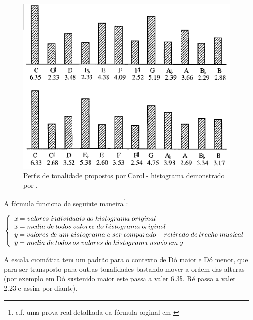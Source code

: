 \documentclass[
	12pt,				%
	openright,			%
	twoside,			%
	a4paper,			%
	english,			%
	french,				%
	spanish,			%
	brazil				%
	]{abntex2}
\begin{document}
\begin{figure}[!h]
	\caption{\label{fig_grafico}Perfis de tonalidade propostos por Carol  - histograma demonstrado por . }
	\begin{center}
	    \includegraphics[scale=0.6]{CBMS/krumhansl_temperley_p174.png}
	\end{center}
\end{figure}


A fórmula funciona da seguinte maneira\footnote{c.f. uma prova real detalhada da fórmula orginal em \cite[p.37]{krumhansl1990cognitive} }:


$ \left\{
  \begin{array}{l l}
x = valores\;individuais\;do\;histograma\;original \\
\overline{x} = media\;de\;todos\;valores\;do\;histograma\;original \\
y = valores\;de\;um\;histograma\;a\;ser\;comparado - retirado\;de\;trecho\;musical \\
\overline{y} = media\;de\;todos\;os\;valores\;do\;histograma\;usado\;em\;y \\
    
  \end{array} \right.
$


\linebreak
\linebreak
A escala cromática tem um padrão para o contexto de Dó maior e Dó menor, que para ser transposto para outras tonalidades bastando mover a ordem das alturas (por exemplo em Dó sustenido maior este passa a valer 6.35, Ré passa a valer 2.23 e assim por diante).
\pagebreak
\end{document}

